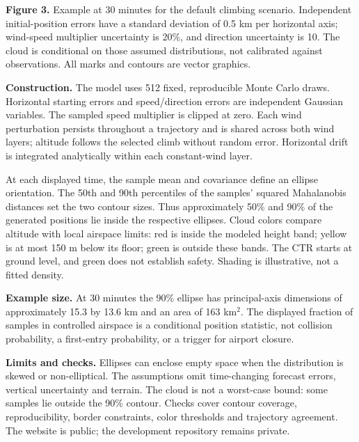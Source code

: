 \documentclass[11pt,a4paper]{article}
\begin{document}
{\small\textbf{Figure 3.} Example at 30 minutes for the default climbing scenario. Independent initial-position errors have a standard deviation of 0.5 km per horizontal axis; wind-speed multiplier uncertainty is 20\%, and direction uncertainty is 10\textdegree. The cloud is conditional on those assumed distributions, not calibrated against observations. All marks and contours are vector graphics.}

\textbf{Construction.} The model uses 512 fixed, reproducible Monte Carlo draws. Horizontal starting errors and speed/direction errors are independent Gaussian variables. The sampled speed multiplier is clipped at zero. Each wind perturbation persists throughout a trajectory and is shared across both wind layers; altitude follows the selected climb without random error. Horizontal drift is integrated analytically within each constant-wind layer.

At each displayed time, the sample mean and covariance define an ellipse orientation. The 50th and 90th percentiles of the samples' squared Mahalanobis distances set the two contour sizes. Thus approximately 50\% and 90\% of the generated positions lie inside the respective ellipses. Cloud colors compare altitude with local airspace limits: red is inside the modeled height band; yellow is at most 150 m below its floor; green is outside these bands. The CTR starts at ground level, and green does not establish safety. Shading is illustrative, not a fitted density.

\textbf{Example size.} At 30 minutes the 90\% ellipse has principal-axis dimensions of approximately 15.3 by 13.6 km and an area of 163 km$^2$. The displayed fraction of samples in controlled airspace is a conditional position statistic, not collision probability, a first-entry probability, or a trigger for airport closure.

\textbf{Limits and checks.} Ellipses can enclose empty space when the distribution is skewed or non-elliptical. The assumptions omit time-changing forecast errors, vertical uncertainty and terrain. The cloud is not a worst-case bound: some samples lie outside the 90\% contour. Checks cover contour coverage, reproducibility, border constraints, color thresholds and trajectory agreement. The website is public; the development repository remains private.
\end{document}

